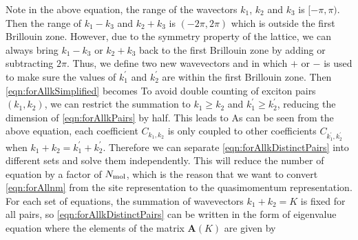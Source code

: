 Note in the above equation, the range of the wavectors $k_1$, $k_2$ and $k_3$ is $[-\pi, \pi)$. Then the range of 
$k_1 - k_3$ and $k_2 + k_3$ is $(-2\pi, 2\pi)$ which is outside the first Brillouin zone. However, due to the symmetry
 property of the lattice, we can always bring $k_1 - k_3$ or $k_2 + k_3$ back to the first Brillouin zone by adding or 
subtracting $2\pi$. Thus, we define two new wavevectors
and 
in which $+$ or $-$ is used to make sure the values of $k_1^{'}$ and $k_2^{'}$ are within the first Brillouin zone. Then 
\autoref{eqn:forAllkSimplified} becomes
To avoid double counting of exciton pairs $(k_1, k_2)$, we can restrict the summation to $k_1 \ge k_2$ and $k_1^{'} \ge k_2^{'}$,
 reducing the dimension of \autoref{eqn:forAllkPairs} by half. This leads to 
As can be seen from the above equation, each coefficient $C_{k_1, k_2}$ is only coupled to other coefficients $C_{k_1^{'},
 k_2^{'}}$ when $k_1 + k_2 = k_1^{'} + k_2^{'} $. Therefore we can separate \autoref{eqn:forAllkDistinctPairs} into 
different sets and solve them independently. This will reduce the number of equation by a factor of $N_{\rm mol}$, which
 is the reason that we want to convert \autoref{eqn:forAllnm} from the site representation to the quasimomentum
 representation. For each set of equations, the summation of wavevectors $k_1 + k_2 =  K$ is fixed for all pairs,
 so \autoref{eqn:forAllkDistinctPairs} can be written in the form of eigenvalue equation 
where the elements of the matrix $\mathbf{A}(K)$ are given by

